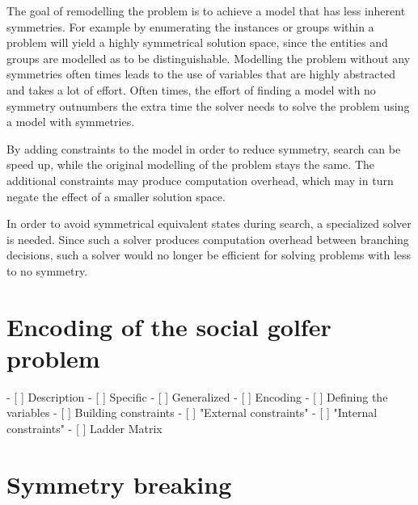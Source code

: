 \documentclass[a4paper]{scrartcl}
\begin{document}
The goal of remodelling the problem is to achieve a model that has less inherent symmetries. For example by enumerating the instances or groups within a problem will yield a highly symmetrical solution space, since the entities and groups are modelled as to be distinguishable. Modelling the problem without any symmetries often times leads to the use of variables that are highly abstracted and takes a lot of effort. Often times, the effort of finding a model with no symmetry outnumbers the extra time the solver needs to solve the problem using a model with symmetries.

By adding constraints to the model in order to reduce symmetry, search can be speed up, while the original modelling of the problem stays the same. The additional constraints may produce computation overhead, which may in turn negate the effect of a smaller solution space.

In order to avoid symmetrical equivalent states during search, a specialized solver is needed. Since such a solver produces computation overhead between branching decisions, such a solver would no longer be efficient for solving problems with less to no symmetry.






\section{Encoding of the social golfer problem}

- [ ] Description
    - [ ] Specific
    - [ ] Generalized
- [ ] Encoding
    - [ ] Defining the variables
    - [ ] Building constraints
        - [ ] "External constraints"
        - [ ] "Internal constraints"
            - [ ] Ladder Matrix

\section{Symmetry breaking}
\end{document}
